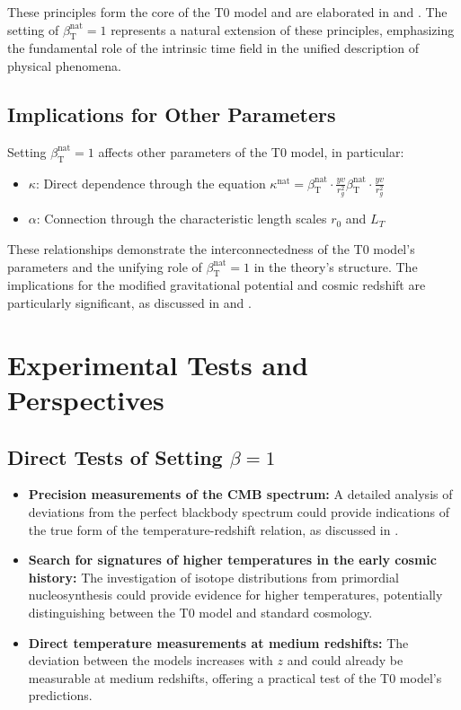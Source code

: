\documentclass[12pt,a4paper]{article}
\newcommand{\betaT}{\beta_{\text{T}}}
\begin{document}
	These principles form the core of the T0 model and are elaborated in \cite{pascher_zeit_2025} and \cite{pascher_lagrange_2025}. The setting of \(\betaT^{\text{nat}} = 1\) represents a natural extension of these principles, emphasizing the fundamental role of the intrinsic time field in the unified description of physical phenomena.
	
	\subsection{Implications for Other Parameters}
	\label{subsec:implications_parameters}
	
	Setting \(\betaT^{\text{nat}} = 1\) affects other parameters of the T0 model, in particular:
	\begin{itemize}
		\item \(\kappa\): Direct dependence through the equation \(\kappa^{\text{nat}} = \betaT^{\text{nat}} \cdot \frac{yv}{r_g^2}\betaT^{\text{nat}} \cdot \frac{yv}{r_g^2}\)
		\item \(\alpha\): Connection through the characteristic length scales \(r_0\) and \(L_T\)
	\end{itemize}
	
	These relationships demonstrate the interconnectedness of the T0 model's parameters and the unifying role of \(\betaT^{\text{nat}} = 1\) in the theory's structure. The implications for the modified gravitational potential and cosmic redshift are particularly significant, as discussed in \cite{pascher_emergente_gravitation_2025} and \cite{pascher_galaxies_2025}.
	
	\section{Experimental Tests and Perspectives}
	\label{sec:experimental_tests}
	
	\subsection{Direct Tests of Setting \(\beta = 1\)}
	\label{subsec:direct_tests}
	
	\begin{itemize}
		\item \textbf{Precision measurements of the CMB spectrum:} A detailed analysis of deviations from the perfect blackbody spectrum could provide indications of the true form of the temperature-redshift relation, as discussed in \cite{pascher_temp_2025}.
		\item \textbf{Search for signatures of higher temperatures in the early cosmic history:} The investigation of isotope distributions from primordial nucleosynthesis could provide evidence for higher temperatures, potentially distinguishing between the T0 model and standard cosmology.
		\item \textbf{Direct temperature measurements at medium redshifts:} The deviation between the models increases with \(z\) and could already be measurable at medium redshifts, offering a practical test of the T0 model's predictions.
	\end{itemize}
	
\end{document}
